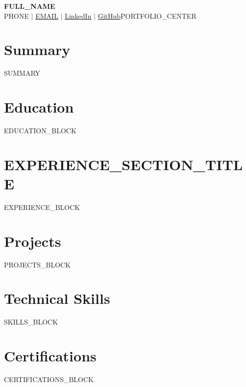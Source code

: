 \documentclass[10pt, letterpaper]{article}
\newcommand{\resumeSubHeadingListStart}{\begin{itemize}[leftmargin=0.15in, label={}]}
\newcommand{\resumeSubHeadingListEnd}{\end{itemize}}
\begin{document}
\begin{center}
    \textbf{\Huge \scshape {{FULL_NAME}}} \\ \vspace{2pt}
    \small {{PHONE}} $|$
    \href{mailto:{{EMAIL}}}{\underline{{{EMAIL}}}} $|$
    \href{{{LINKEDIN_URL}}}{\underline{LinkedIn}} $|$
    \href{{{GITHUB_URL}}}{\underline{GitHub}}{{PORTFOLIO_CENTER}}
\end{center}

\vspace{-4pt}

\section{Summary}
\begin{itemize}[leftmargin=0.15in, label={}]
    \small{\item{{{SUMMARY}}}}
\end{itemize}

\section{Education}
\resumeSubHeadingListStart
{{EDUCATION_BLOCK}}
\resumeSubHeadingListEnd

\section{{{EXPERIENCE_SECTION_TITLE}}}
\resumeSubHeadingListStart
{{EXPERIENCE_BLOCK}}
\resumeSubHeadingListEnd

\section{Projects}
\resumeSubHeadingListStart
{{PROJECTS_BLOCK}}
\resumeSubHeadingListEnd

\section{Technical Skills}
\begin{itemize}[leftmargin=0.15in, label={}]
    \small{\item{
        {{SKILLS_BLOCK}}
    }}
\end{itemize}

\section{Certifications}
\begin{itemize}[leftmargin=0.15in, label={}]
    \small{\item{
        {{CERTIFICATIONS_BLOCK}}
    }}
\end{itemize}
\end{document}
